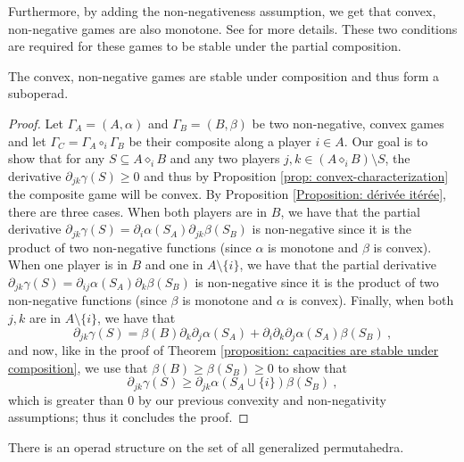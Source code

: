 \documentclass[a4paper,12pt]{amsart}
\begin{document}
Furthermore, by adding the non-negativeness assumption, we get that convex, non-negative games are also monotone. See \cite[Theorem~2.20, Point iii)]{Grabisch} for more details. These two conditions are required for these games to be stable under the partial composition.

\begin{theorem}\label{thm: opérade des convexes}
    The convex, non-negative games are stable under composition and thus form a suboperad. 
\end{theorem}

\begin{proof}
Let \(\Gamma_A = (A, \alpha) \) and \(\Gamma_B = (B, \beta)\) be two non-negative, convex games and let \(\Gamma_C = \Gamma_A \circ_i \Gamma_B\) be their composite along a player \(i \in A\). Our goal is to show that for any \(S \subseteq A \diamond_i B\) and any two players \(j, k \in (A \diamond_i B) \setminus S\), the derivative $\partial_{jk} \gamma(S) \geq 0$ and thus by Proposition \ref{prop: convex-characterization} the composite game will be convex. By Proposition \ref{Proposition: dérivée itérée}, there are three cases. When both players are in $B$, we have that the partial derivative $\partial_{jk} \gamma(S) = \partial_i\alpha(S_A)\partial_{jk}\beta(S_B)$ is non-negative since it is the product of two non-negative functions (since $\alpha$ is monotone and $\beta$ is convex). When one player is in $B$ and one in $A \setminus \{i\}$, we have that the partial derivative $\partial_{jk} \gamma(S) = \partial_{ij}\alpha(S_A)\partial_{k}\beta(S_B)$ is non-negative since it is the product of two non-negative functions (since $\beta$ is monotone and $\alpha$ is convex). Finally, when both $j,k$ are in $A \setminus \{i\}$, we have that
\[
\partial_{jk} \gamma(S) = \beta(B) \partial_k \partial_j \alpha(S_A) + \partial_i \partial_k \partial_j \alpha(S_A) \beta(S_B)~, 
\]
and now, like in the proof of Theorem \ref{proposition: capacities are stable under composition}, we use that \(\beta(B) \geq \beta(S_B) \geq 0\) to show that 
\[
\partial_{jk} \gamma(S) \geq \partial_{jk} \alpha(S_A \cup \{i\}) \beta(S_B)~,
\]
which is greater than $0$ by our previous convexity and non-negativity assumptions; thus it concludes the proof. 
\end{proof}

\begin{corollary}
There is an operad structure on the set of all generalized permutahedra.     
\end{corollary}
\end{document}
